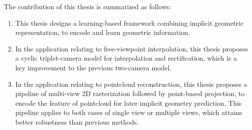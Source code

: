 The contribution of this thesis is summarized as follows:
\begin{enumerate}
\item This thesis designs a learning-based framework combining implicit geometric representation, to encode and learn geometric information.
\item In the application relating to free-viewpoint interpolation, this thesis proposes a cyclic triplet-camera model for interpolation and rectification, which is a key improvement to the previous two-camera model.
\item In the application relating to pointcloud reconstruction, this thesis proposes a pipeline of multi-view 2D rasterization followed by point-based projection, to encode the feature of pointcloud for later implicit geometry prediction. This pipeline applies to both cases of single view or multiple views, which attains better robustness than previous methods.
\end{enumerate}

